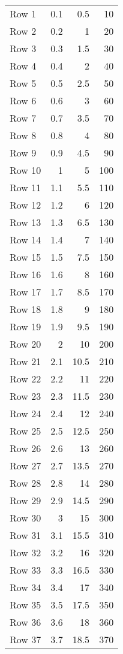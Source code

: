 \begin{center}
{\begin{longtable}[H!]{@{\extracolsep{\fill}}lrrr}
Row 1   & 0.1 & 0.5  & 10   \\
Row 2   & 0.2 & 1    & 20   \\
Row 3   & 0.3 & 1.5  & 30   \\
Row 4   & 0.4 & 2    & 40   \\
Row 5   & 0.5 & 2.5  & 50   \\
Row 6   & 0.6 & 3    & 60   \\
Row 7   & 0.7 & 3.5  & 70   \\
Row 8   & 0.8 & 4    & 80   \\
Row 9   & 0.9 & 4.5  & 90   \\
Row 10  & 1   & 5    & 100  \\
Row 11  & 1.1 & 5.5  & 110  \\
Row 12  & 1.2 & 6    & 120  \\
Row 13  & 1.3 & 6.5  & 130  \\
Row 14  & 1.4 & 7    & 140  \\
Row 15  & 1.5 & 7.5  & 150  \\
Row 16  & 1.6 & 8    & 160  \\
Row 17  & 1.7 & 8.5  & 170  \\
Row 18  & 1.8 & 9    & 180  \\
Row 19  & 1.9 & 9.5  & 190  \\
Row 20  & 2   & 10   & 200  \\
Row 21  & 2.1 & 10.5 & 210  \\
Row 22  & 2.2 & 11   & 220  \\
Row 23  & 2.3 & 11.5 & 230  \\
Row 24  & 2.4 & 12   & 240  \\
Row 25  & 2.5 & 12.5 & 250  \\
Row 26  & 2.6 & 13   & 260  \\
Row 27  & 2.7 & 13.5 & 270  \\
Row 28  & 2.8 & 14   & 280  \\
Row 29  & 2.9 & 14.5 & 290  \\
Row 30  & 3   & 15   & 300  \\
Row 31  & 3.1 & 15.5 & 310  \\
Row 32  & 3.2 & 16   & 320  \\
Row 33  & 3.3 & 16.5 & 330  \\
Row 34  & 3.4 & 17   & 340  \\
Row 35  & 3.5 & 17.5 & 350  \\
Row 36  & 3.6 & 18   & 360  \\
Row 37  & 3.7 & 18.5 & 370  \\

\end{longtable}}
\end{center}
